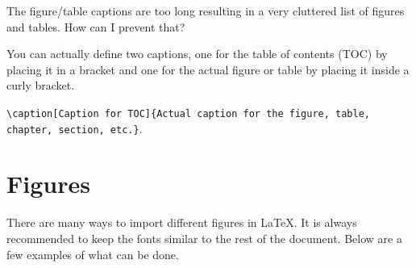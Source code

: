 \begin{QandA}
\item The figure/table captions are too long resulting in a very cluttered list of figures and tables. How can I prevent that?
	
		\begin{answered}
		You can actually define two captions, one for the table of contents (TOC) by placing it in a bracket and one for the actual figure or table by placing it inside a curly bracket.
		
		\verb|\caption[Caption for TOC]{Actual caption for the figure, table, chapter, section, etc.}|.
		
		
		\end{answered}
		

		
\end{QandA}

\section{Figures}
\label{sec:Figures}
There are many ways to import different figures in \LaTeX. It is always recommended to keep the fonts similar to the rest of the document. Below are a few examples of what can be done.

